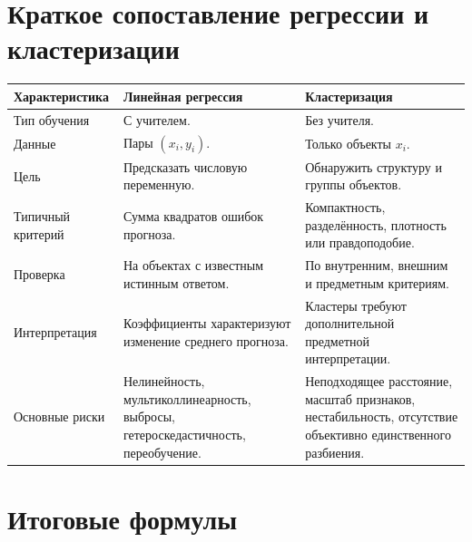 \documentclass[12pt,a4paper]{article}
\theoremstyle{definition}
\theoremstyle{remark}
\begin{document}
\section{Краткое сопоставление регрессии и кластеризации}

\begin{table}[ht]
\centering
\begin{tabularx}{\textwidth}{
    >{\raggedright\arraybackslash}p{4cm}
    >{\raggedright\arraybackslash}X
    >{\raggedright\arraybackslash}X}
\toprule
\textbf{Характеристика} &
\textbf{Линейная регрессия} &
\textbf{Кластеризация}\\
\midrule

Тип обучения &
С учителем. &
Без учителя.\\

Данные &
Пары $(x_i,y_i)$. &
Только объекты $x_i$.\\

Цель &
Предсказать числовую переменную. &
Обнаружить структуру и группы объектов.\\

Типичный критерий &
Сумма квадратов ошибок прогноза. &
Компактность, разделённость, плотность или правдоподобие.\\

Проверка &
На объектах с известным истинным ответом. &
По внутренним, внешним и предметным критериям.\\

Интерпретация &
Коэффициенты характеризуют изменение среднего прогноза. &
Кластеры требуют дополнительной предметной интерпретации.\\

Основные риски &
Нелинейность, мультиколлинеарность, выбросы, гетероскедастичность,
переобучение. &
Неподходящее расстояние, масштаб признаков, нестабильность, отсутствие
объективно единственного разбиения.\\

\bottomrule
\end{tabularx}
\end{table}

\section{Итоговые формулы}
\end{document}
